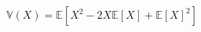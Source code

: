 \documentclass[preview]{standalone}
\begin{document}
\begin{align*}
\mathbb{V}(X) = \mathbb{E}\left[X^2 - 2X\mathbb{E}[X] + \mathbb{E}[X]^2\right]
\end{align*}
\end{document}

